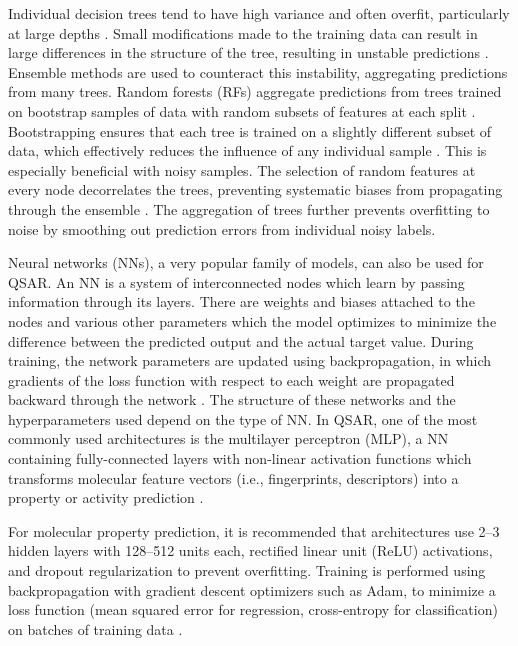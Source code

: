 Individual decision trees tend to have high variance and often overfit, particularly at large depths \citep{Breiman1984}. Small modifications made to the training data can result in large differences in the structure of the tree, resulting in unstable predictions \citep{Breiman2001}. Ensemble methods are used to counteract this instability, aggregating predictions from many trees. Random forests (RFs) aggregate predictions from trees trained on bootstrap samples of data with random subsets of features at each split \citep{Breiman2001}. Bootstrapping ensures that each tree is trained on a slightly different subset of data, which effectively reduces the influence of any individual sample \citep{Breiman2001}. This is especially beneficial with noisy samples. The selection of random features at every node decorrelates the trees, preventing systematic biases from propagating through the ensemble \citep{Breiman2001}. The aggregation of trees further prevents overfitting to noise by smoothing out prediction errors from individual noisy labels. 

Neural networks (NNs), a very popular family of models, can also be used for QSAR. An NN is a system of interconnected nodes which learn by passing information through its layers. There are weights and biases attached to the nodes and various other parameters which the model optimizes to minimize the difference between the predicted output and the actual target value. During training, the network parameters are updated using backpropagation, in which gradients of the loss function with respect to each weight are propagated backward through the network \citep{Rumelhart1986}. The structure of these networks and the hyperparameters used depend on the type of NN. In QSAR, one of the most commonly used architectures is the multilayer perceptron (MLP), a NN containing fully-connected layers with non-linear activation functions which transforms molecular feature vectors (i.e., fingerprints, descriptors) into a property or activity prediction \citep{Ma2015}.

For molecular property prediction, it is recommended that architectures use 2--3 hidden layers with 128--512 units each, rectified linear unit (ReLU) activations, and dropout regularization to prevent overfitting. Training is performed using backpropagation with gradient descent optimizers such as Adam, to minimize a loss function (mean squared error for regression, cross-entropy for classification) on batches of training data \citep{wu2018}. 

